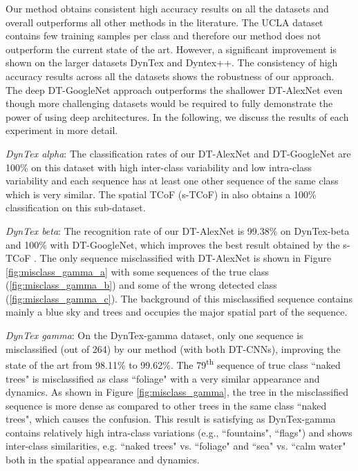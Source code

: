 \documentclass[a4paper,11pt]{article}
\begin{document}
Our method obtains consistent high accuracy results on all the datasets and overall outperforms all other methods in the literature.
The UCLA dataset contains few training samples per class and therefore our method does not outperform the current state of the art.
However, a significant improvement is shown on the larger datasets DynTex and Dyntex++.
The consistency of high accuracy results across all the datasets shows the robustness of our approach.
The deep DT-GoogleNet approach outperforms the shallower DT-AlexNet even though more challenging datasets would be required to fully demonstrate the power of using deep architectures.
In the following, we discuss the results of each experiment in more detail.

\textit{DynTex alpha}: The classification rates of our DT-AlexNet and DT-GoogleNet are 100\% on this dataset with high inter-class variability and low intra-class variability and each sequence has at least one other sequence of the same class which is very similar.
The spatial TCoF (s-TCoF) in \cite{qi2016dynamic} also obtains a 100\% classification on this sub-dataset.

\textit{DynTex beta}: The recognition rate of our DT-AlexNet is 99.38\% on DynTex-beta and 100\% with DT-GoogleNet, which improves the best result obtained by the s-TCoF \cite{qi2016dynamic}.
The only sequence misclassified with DT-AlexNet is shown in Figure \ref{fig:misclass_gamma_a} with some sequences of the true class (\ref{fig:misclass_gamma_b})
and some of the wrong detected class (\ref{fig:misclass_gamma_c}).
The background of this misclassified sequence contains mainly a blue sky and trees and occupies the major spatial part of the sequence.

\textit{DynTex gamma}: On the DynTex-gamma dataset, only one sequence is misclassified (out of 264) by our method (with both DT-CNNs),
improving the state of the art \cite{qi2016dynamic} from 98.11\% to 99.62\%.
The 79\textsuperscript{th} sequence of true class ``naked trees" is misclassified as class ``foliage" with a very similar appearance and dynamics.
As shown in Figure \ref{fig:misclass_gamma}, the tree in the misclassified sequence  is more dense as compared to other trees in the same class ``naked trees", which causes the confusion. 
This result is satisfying as DynTex-gamma contains relatively high intra-class variations (e.g., ``fountains", ``flags")
and shows inter-class similarities, e.g. ``naked trees" vs. ``foliage" and ``sea" vs. ``calm water" both in the spatial appearance and dynamics.
\end{document}
